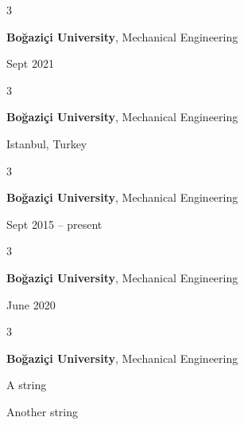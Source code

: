 \documentclass[10pt, letterpaper]{article}
\newenvironment{summary}{
    \begin{description}[
        topsep=0.10 cm,
        parsep=0.10 cm,
        partopsep=0pt,
        itemsep=0pt,
        leftmargin=0.4 cm + 10pt
    ]
}{
    \end{description}
} %
\newenvironment{threecolentry}[3][]{
    \onecolentry
    \def\thirdColumn{#3}
    \setcolumnwidth{1 cm, \fill, 4.5 cm}
    \begin{paracol}{3}
    {\raggedright #2} \switchcolumn
}{
    \switchcolumn \raggedleft \thirdColumn
    \end{paracol}
    \endonecolentry
} %
\begin{document}
        \vspace{0.2 cm}

        \begin{threecolentry}{\textbf{}}{
            Sept 2021
        }
            \textbf{Boğaziçi University}, Mechanical Engineering
        \end{threecolentry}

        \vspace{0.2 cm}

        \begin{threecolentry}{\textbf{}}{
            Istanbul, Turkey
        }
            \textbf{Boğaziçi University}, Mechanical Engineering
        \end{threecolentry}

        \vspace{0.2 cm}

        \begin{threecolentry}{\textbf{}}{
            Sept 2015 – present
        }
            \textbf{Boğaziçi University}, Mechanical Engineering
        \end{threecolentry}

        \vspace{0.2 cm}

        \begin{threecolentry}{\textbf{}}{
            June 2020
        }
            \textbf{Boğaziçi University}, Mechanical Engineering
        \end{threecolentry}

        \vspace{0.2 cm}

        \begin{threecolentry}{\textbf{}}{
            
        }
            \textbf{Boğaziçi University}, Mechanical Engineering
            \begin{summary}
                \item A string
                \item Another string
            \end{summary}
        \end{threecolentry}

        \vspace{0.2 cm}
\end{document}
